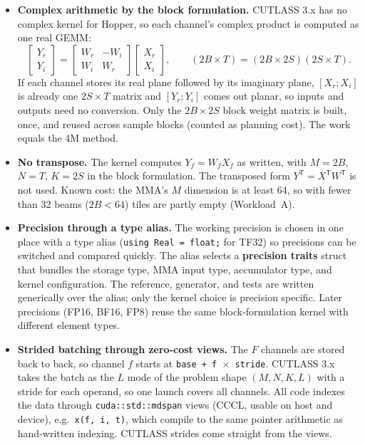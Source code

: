 \documentclass[10pt,letterpaper]{article}
\begin{document}
\begin{itemize}
  \item \textbf{Complex arithmetic by the block formulation.} CUTLASS 3.x has no complex kernel for Hopper, so each channel's complex product is computed as one real GEMM:
  \[
    \begin{bmatrix} Y_r \\ Y_i \end{bmatrix}
    =
    \begin{bmatrix} W_r & -W_i \\ W_i & W_r \end{bmatrix}
    \begin{bmatrix} X_r \\ X_i \end{bmatrix},
    \qquad
    (2B \times T) = (2B \times 2S)(2S \times T).
  \]
  If each channel stores its real plane followed by its imaginary plane, $[X_r; X_i]$ is already one $2S \times T$ matrix and $[Y_r; Y_i]$ comes out planar, so inputs and outputs need no conversion. Only the $2B \times 2S$ block weight matrix is built, once, and reused across sample blocks (counted as planning cost). The work equals the 4M method.
  \item \textbf{No transpose.} The kernel computes $Y_f = W_f X_f$ as written, with $M = 2B$, $N = T$, $K = 2S$ in the block formulation. The transposed form $Y^{\mathsf T} = X^{\mathsf T} W^{\mathsf T}$ is not used. Known cost: the MMA's $M$ dimension is at least 64, so with fewer than 32 beams ($2B < 64$) tiles are partly empty (Workload~A).
  \item \textbf{Precision through a type alias.} The working precision is chosen in one place with a type alias (\texttt{using Real = float;} for TF32) so precisions can be switched and compared quickly. The alias selects a \textbf{precision traits} struct that bundles the storage type, MMA input type, accumulator type, and kernel configuration. The reference, generator, and tests are written generically over the alias; only the kernel choice is precision specific. Later precisions (FP16, BF16, FP8) reuse the same block-formulation kernel with different element types.
  \item \textbf{Strided batching through zero-cost views.} The $F$ channels are stored back to back, so channel $f$ starts at \texttt{base + f $\times$ stride}. CUTLASS 3.x takes the batch as the $L$ mode of the problem shape $(M, N, K, L)$ with a stride for each operand, so one launch covers all channels. All code indexes the data through \texttt{cuda::std::mdspan} views (CCCL, usable on host and device), e.g.\ \texttt{x(f, i, t)}, which compile to the same pointer arithmetic as hand-written indexing. CUTLASS strides come straight from the views.

\end{itemize}
\end{document}

